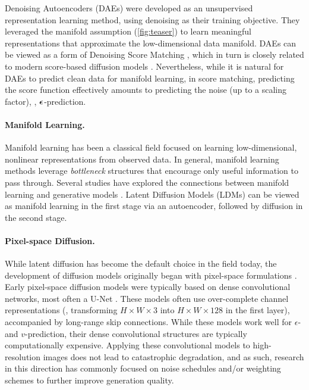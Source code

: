 Denoising Autoencoders (DAEs) \cite{vincent2008extracting,vincent2010stacked} were developed as an unsupervised representation learning method, using denoising as their training objective. They leveraged the manifold assumption \cite{Chapelle2006SemiSupervised} (\cref{fig:teaser}) to learn meaningful representations that approximate the low-dimensional data manifold. DAEs can be viewed as a form of Denoising Score Matching \cite{vincent2011connection}, which in turn is closely related to modern score-based diffusion models \cite{Song2019,Song2021}. Nevertheless, while it is natural for DAEs to predict clean data for manifold learning, in score matching, predicting the score function effectively amounts to predicting the noise (up to a scaling factor), \ie, $\bm{\epsilon}$-prediction.

\paragraph{Manifold Learning.} Manifold learning has been a classical field \cite{roweis2000nonlinear,tenenbaum2000global} focused on learning low-dimensional, nonlinear representations from observed data. In general, manifold learning methods leverage \textit{bottleneck} structures \cite{tishby2000information,rifai2011contractive,makhzani2013k,alemi2016deep} that encourage only useful information to pass through. Several studies have explored the connections between manifold learning and generative models \cite{loaiza2024deep,humayun2024secrets,chen2024deconstructing}. Latent Diffusion Models (LDMs) \cite{Rombach2022} can be viewed as manifold learning in the first stage via an autoencoder, followed by diffusion in the second stage.

\paragraph{Pixel-space Diffusion.} 
While latent diffusion \cite{Rombach2022} has become the default choice in the field today, the development of diffusion models originally began with pixel-space formulations \cite{Song2019,Ho2020,nichol2021improved,dhariwal2021diffusion}.
Early pixel-space diffusion models were typically based on dense convolutional networks, most often a U-Net \cite{ronneberger2015u}. These models often use over-complete channel representations (\eg, transforming $H{\times}W{\times}3$ into $H{\times}W{\times}128$ in the first layer), accompanied by long-range skip connections. While these models work well for $\epsilon$- and $v$-prediction, their dense convolutional structures are typically computationally expensive.
Applying these convolutional models to high-resolution images does not lead to catastrophic degradation, and as such, research in this direction has commonly focused on noise schedules and/or weighting schemes \cite{chen2023importance,hoogeboom2023simple,hoogeboom2024simpler,Kingma2023} to further improve generation quality.

